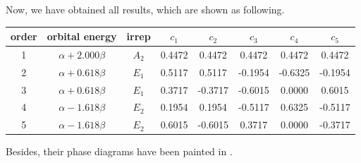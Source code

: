 		Now, we have obtained all results, which are shown as following.
		
		\begin{center}
		\setlength{\abovecaptionskip}{-0.5em}
		\begin{tabular}{cccccccc}\hline
		order 	& orbital energy & irrep & $c_1$ & $c_2$ & $c_3$ &$c_4$ &	$c_5$	\\ \hline
			1	&	$\alpha+2.000\beta$	&	$A_2$	&	0.4472	&	0.4472	&	0.4472	&	0.4472	&	0.4472	\\
			2	&	$\alpha+0.618\beta$	&	$E_1$	&	0.5117	&	0.5117	&	-0.1954	&	-0.6325	&	-0.1954	\\
			3	&	$\alpha+0.618\beta$	&	$E_1$	&	0.3717	&	-0.3717	&	-0.6015	&	0.0000	&	0.6015	\\
			4	&	$\alpha-1.618\beta$	&	$E_2$	&	0.1954	&	0.1954	&	-0.5117	&	0.6325	&	-0.5117	\\
			5	&	$\alpha-1.618\beta$	&	$E_2$	&	0.6015	&	-0.6015	&	0.3717	&	0.0000	&	-0.3717	\\ \hline
		\end{tabular}
		\end{center}
		
		Besides, their phase diagrams have been painted in .
		

